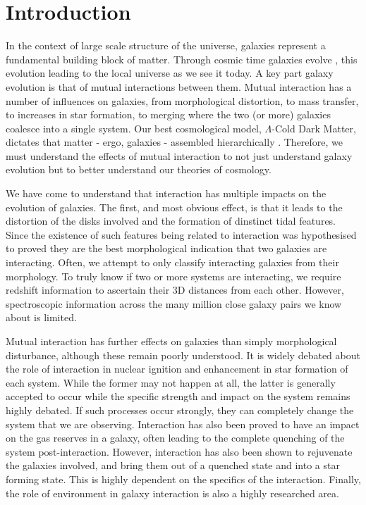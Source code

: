 \chapter{Introduction}
In the context of large scale structure of the universe, galaxies represent a fundamental building block of matter. Through cosmic time galaxies evolve \citep{2005Natur.435..629S}, this evolution leading to the local universe as we see it today. A key part galaxy evolution is that of mutual interactions between them. Mutual interaction has a number of influences on galaxies, from morphological distortion, to mass transfer, to increases in star formation, to merging where the two (or more) galaxies coalesce into a single system. Our best cosmological model, $\Lambda$-Cold Dark Matter, dictates that matter - ergo, galaxies - assembled hierarchically \citep{1978MNRAS.183..341W, 1991ApJ...379...52W}. Therefore, we must understand the effects of mutual interaction to not just understand galaxy evolution but to better understand our theories of cosmology.

We have come to understand that interaction has multiple impacts on the evolution of galaxies. The first, and most obvious effect, is that it leads to the distortion of the disks involved and the formation of dinstinct tidal features. Since the existence of such features being related to interaction was hypothesised to proved \citep{Toomre_72} they are the best morphological indication that two galaxies are interacting. Often, we attempt to only classify interacting galaxies from their morphology. To truly know if two or more systems are interacting, we require redshift information to ascertain their 3D distances from each other. However, spectroscopic information across the many million close galaxy pairs we know about is limited.

Mutual interaction has further effects on galaxies than simply morphological disturbance, although these remain poorly understood. It is widely debated about the role of interaction in nuclear ignition and enhancement in star formation of each system. While the former may not happen at all, the latter is generally accepted to occur while the specific strength and impact on the system remains highly debated. If such processes occur strongly, they can completely change the system that we are observing. Interaction has also been proved to have an impact on the gas reserves in a galaxy, often leading to the complete quenching of the system post-interaction. However, interaction has also been shown to rejuvenate the galaxies involved, and bring them out of a quenched state and into a star forming state. This is highly dependent on the specifics of the interaction. Finally, the role of environment in galaxy interaction is also a highly researched area.

